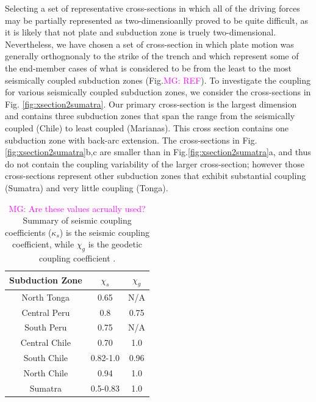 \documentclass[12pt]{article}
\newcommand{\mgnote}[1]{\textcolor{magenta}{MG: #1}}
\begin{document}
Selecting a set of representative cross-sections in which all of the driving forces may be partially represented as two-dimensioanlly proved to be quite difficult, as it is likely that not plate and subduction zone is truely two-dimensional. 
Nevertheless, we have chosen a set of cross-section in which plate motion was generally orthognonaly to the strike of the trench and which represent some of the end-member cases of what is considered to be from the least to the most seismically coupled subduction zones (Fig.\mgnote{REF}). To investigate the coupling for various seismically coupled subduction zones, we consider the cross-sections in Fig. \ref{fig:xsection2sumatra}. Our primary cross-section is the largest dimension and contains three subduction zones that span the range from the seismically coupled (Chile) to least coupled (Marianas). This cross section contains one subduction zone with back-arc extension. The cross-sections in Fig.\ref{fig:xsection2sumatra}b,c are smaller than in  Fig.\ref{fig:xsection2sumatra}a, and thus do not contain the coupling variability of the larger cross-section; however those cross-sections represent other subduction zones that exhibit substantial coupling (Sumatra) and very little coupling (Tonga).

\begin{table}[H]
  \caption{\mgnote{Are these values acrually used?}Summary of seismic coupling coefficients ($\kappa_s$) is the seismic coupling coefficient, while $\chi_g$ is the geodetic coupling coefficient \citep{scholz2012seismic}.} %
  \centering  %
  \begin{tabular}{c c c} %
    \hline \hline                        %
    Subduction Zone & $\chi_s$ & $\chi_g$  \\ [0.5ex] %
    \hline                  %
    North Tonga  &0.65 &N/A   \\
    Central Peru &0.8 &0.75 \\
    South Peru &0.75 &N/A \\
    Central Chile &0.70 &1.0 \\
    South Chile  &0.82-1.0 &0.96 \\
    North Chile &0.94 &1.0 \\
    Sumatra &0.5-0.83 &1.0 \\
    \hline %
  \end{tabular}
  \label{table:parameters} %
\end{table}
\end{document}
